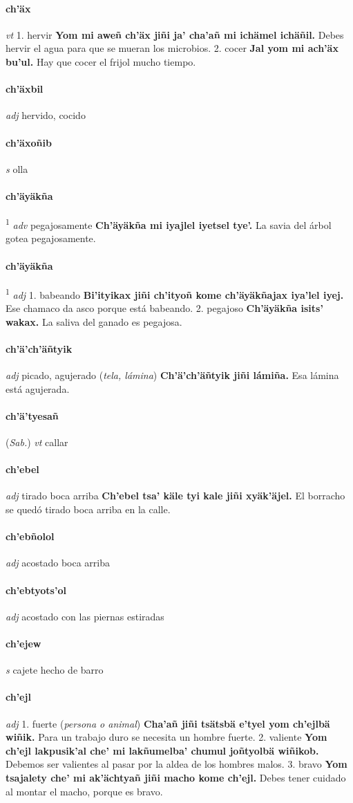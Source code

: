 \documentclass{scrbook}
\newcommand{\entry}[1]{\paragraph{#1}}
\newcommand{\onedefinition}[1]{#1.}
\newcommand{\defsuperscript}[1]{\textsuperscript{1}}
\newcommand{\partofspeech}[1]{\textit{#1}}
\newcommand{\spanishtranslation}[1]{#1}
\newcommand{\clarification}[1]{(\textit{#1})}
\newcommand{\cholexample}[1]{\textbf{#1}}
\newcommand{\exampletranslation}[1]{#1}
\newcommand{\relevantdialect}[1]{(\textit{#1})}
\begin{document}
\begin{multicols}{2}
\entry{ch'äx}
\partofspeech{vt}
\onedefinition{1}
\spanishtranslation{hervir}
\cholexample{Yom mi aweñ ch'äx jiñi ja' cha'añ mi ichämel ichäñil.}
\exampletranslation{Debes hervir el agua para que se mueran los microbios.}
\onedefinition{2}
\spanishtranslation{cocer}
\cholexample{Jal yom mi ach'äx bu'ul.}
\exampletranslation{Hay que cocer el frijol mucho tiempo.}

\entry{ch'äxbil}
\partofspeech{adj}
\spanishtranslation{hervido, cocido}

\entry{ch'äxoñib}
\partofspeech{s}
\spanishtranslation{olla}

\entry{ch'äyäkña}
\defsuperscript{1}
\partofspeech{adv}
\spanishtranslation{pegajosamente}
\cholexample{Ch'äyäkña mi iyajlel iyetsel tye'.}
\exampletranslation{La savia del árbol gotea pegajosamente.}

\entry{ch'äyäkña}
\defsuperscript{2}
\partofspeech{adj}
\onedefinition{1}
\spanishtranslation{babeando}
\cholexample{Bi'ityikax jiñi ch'ityoñ kome ch'äyäkñajax iya'lel iyej.}
\exampletranslation{Ese chamaco da asco porque está babeando.}
\onedefinition{2}
\spanishtranslation{pegajoso}
\cholexample{Ch'äyäkña isits' wakax.}
\exampletranslation{La saliva del ganado es pegajosa.}

\entry{ch'ä'ch'äñtyik}
\partofspeech{adj}
\spanishtranslation{picado, agujerado}
\clarification{tela, lámina}
\cholexample{Ch'ä'ch'äñtyik jiñi lámiña.}
\exampletranslation{Esa lámina está agujerada.}

\entry{ch'ä'tyesañ}
\relevantdialect{Sab.}
\partofspeech{vt}
\spanishtranslation{callar}

\entry{ch'ebel}
\partofspeech{adj}
\spanishtranslation{tirado boca arriba}
\cholexample{Ch'ebel tsa' käle tyi kale jiñi xyäk'äjel.}
\exampletranslation{El borracho se quedó tirado boca arriba en la calle.}

\entry{ch'ebñolol}
\partofspeech{adj}
\spanishtranslation{acostado boca arriba}

\entry{ch'ebtyots'ol}
\partofspeech{adj}
\spanishtranslation{acostado con las piernas estiradas}

\entry{ch'ejew}
\partofspeech{s}
\spanishtranslation{cajete hecho de barro}

\entry{ch'ejl}
\partofspeech{adj}
\onedefinition{1}
\spanishtranslation{fuerte}
\clarification{persona o animal}
\cholexample{Cha'añ jiñi tsätsbä e'tyel yom ch'ejlbä wiñik.}
\exampletranslation{Para un trabajo duro se necesita un hombre fuerte.}
\onedefinition{2}
\spanishtranslation{valiente}
\cholexample{Yom ch'ejl lakpusik'al che' mi lakñumelba' chumul joñtyolbä wiñikob.}
\exampletranslation{Debemos ser valientes al pasar por la aldea de los hombres malos.}
\onedefinition{3}
\spanishtranslation{bravo}
\cholexample{Yom tsajalety che' mi ak'ächtyañ jiñi macho kome ch'ejl.}
\exampletranslation{Debes tener cuidado al montar el macho, porque es bravo.}


\end{multicols}
\end{document}
